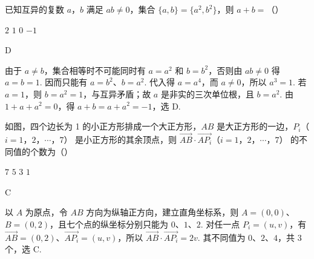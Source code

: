 \begin{problem}
已知互异的复数 \(a\)，\(b\) 满足 \(ab \neq 0\)，集合 \(\{a, b\} = \{a^2, b^2\}\)，则 \(a + b =\)（\quad）

\choices
    {\(2\)}
    {\(1\)}
    {\(0\)}
    {\(-1\)}

\begin{answer}
D
\end{answer}

\begin{solution}
由于 \(a\ne b\)，集合相等时不可能同时有 \(a=a^2\) 和 \(b=b^2\)，否则由 \(ab\ne0\) 得 \(a=b=1\). 因而只能有 \(a=b^2\)、\(b=a^2\). 代入得 \(a=a^4\)，而 \(a\ne0\)，所以 \(a^3=1\). 若 \(a=1\)，则 \(b=a^2=1\)，与互异矛盾；故 \(a\) 是非实的三次单位根，且 \(b=a^2\). 由 \(1+a+a^2=0\)，得 \(a+b=a+a^2=-1\)，选 D.
\end{solution}
\end{problem}

\begin{problem}
如图，四个边长为 1 的小正方形排成一个大正方形，\(AB\) 是大正方形的一边，\(P_i\)（\(i=1\)，\(2\)，\(\cdots\)，\(7\)） 是小正方形的其余顶点，则 \(\overrightarrow{AB} \cdot \overrightarrow{AP_i}\)（\(i=1\)，\(2\)，\(\cdots\)，\(7\)） 的不同值的个数为（\quad）


\choices
    {\(7\)}
    {\(5\)}
    {\(3\)}
    {\(1\)}

\begin{answer}
C
\end{answer}

\begin{solution}
以 \(A\) 为原点，令 \(AB\) 方向为纵轴正方向，建立直角坐标系，则 \(A=(0,0)\)、\(B=(0,2)\)，且七个点的纵坐标分别只能为 \(0\)、\(1\)、\(2\). 对任一点 \(P_i=(u,v)\)，有 \(\overrightarrow{AB}=(0,2)\)、\(\overrightarrow{AP_i}=(u,v)\)，所以 \(\overrightarrow{AB}\cdot\overrightarrow{AP_i}=2v\). 其不同值为 \(0\)、\(2\)、\(4\)，共 \(3\) 个，选 C.
\end{solution}
\end{problem}

